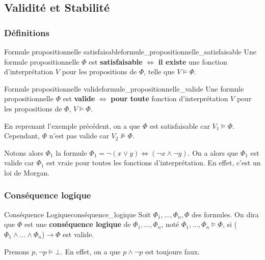 \subsection{Validité et Stabilité}
\subsubsection{Définitions}
\begin{definition}{Formule propositionnelle satisfaisable}{formule_propositionnelle_satisfaisable}
Une formule propositionnelle $\Phi$ est \textbf{satisfaisable} $\Leftrightarrow$ \textbf{il existe} une fonction d'interprétation $V$ pour les propositions de $\Phi$, telle que 
$V\vDash\Phi$.
\end{definition}
\begin{definition}{Formule propositionnelle valide}{formule_propositionnelle_valide}
Une formule propositionnelle $\Phi$ est \textbf{valide} $\Leftrightarrow$ \textbf{pour toute} fonction d'interprétation $V$ pour les propositions de $\Phi$, $V\vDash\Phi$.
\end{definition}

\begin{example}\leavevmode
  En reprenant l'exemple précédent, on a que $\Phi$ est satisfaisable car $V_1\vDash\Phi$. Cependant, $\Phi$ n'est pas valide car $V_2\nvDash\Phi$.

  Notons alors $\Phi_1$ la formule $\Phi_1 = \neg(x\vee y) \iff (\neg x \wedge \neg y)$.
  On a alors que $\Phi_1$ est valide car $\Phi_1$ est vraie pour toutes les fonctions d'interprétation. 
  En effet, c'est un loi de Morgan.
\end{example}

\subsubsection{Conséquence logique}
\begin{definition}{Conséquence Logique}{conséquence_logique}
Soit $\Phi_1,...,\Phi_n,\Phi$ des formules. On dira que $\Phi$ est une \textbf{conséquence logique} de $\Phi_1,...,\Phi_n$, noté $\Phi_1,...,\Phi_n\vDash\Phi$, si ($\Phi_1\land ...\land\Phi_n$)$\rightarrow\Phi$ est valide.
\end{definition}

\begin{example}\leavevmode
  Prenons $p, \neg p \vDash \bot$. En effet, on a que $p\land\neg p$ est toujours faux.

\end{example}

